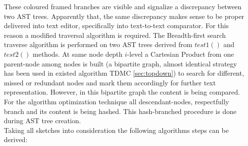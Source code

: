 \documentclass{report}
\begin{document}
These coloured framed branches are visible and signalize a discrepancy between two AST trees. Apparently that, the same discrepancy makes sense to be proper delivered into text editor,  specifically into text-to-text comparator. For this reason a modified traversal algorithm is required. The Breadth-first search traverse algorithm is performed on two AST trees derived from $test1()$ and $test2()$ methods. At same node depth $i$-level a Cartesian Product from one parent-node among nodes is built (a bipartite graph, almost identical strategy has been used in existed algorithm TDMC \ref{sec:topdown}) to search for different, missed or redundant nodes and mark them accordingly for further text representation. However, in this bipartite graph the content is being compared. For the algorithm optimization technique all descendant-nodes, respectfully branch and its content is being hashed. This hash-branched procedure is done during AST tree creation. 
\\
Taking all sketches into consideration  the following algorithms steps can be derived:
\end{document}
